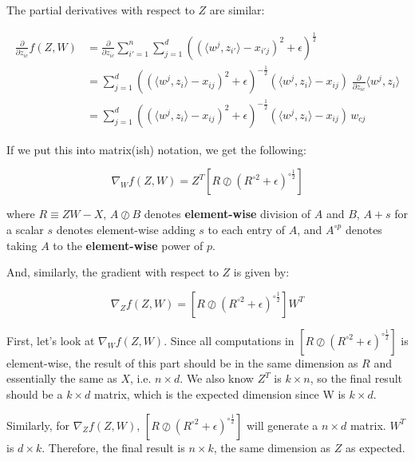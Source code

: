 The partial derivatives with respect to $Z$ are similar:

\begin{align*}
\frac{\partial}{\partial z_{ic}} f(Z,W)
  &= \frac{\partial}{\partial z_{ic}} \sum_{i'=1}^n \sum_{j=1}^d  \left( (\langle w^j, z_{i'}\rangle - x_{i'j})^2 + \epsilon \right)^{\frac12}\\
  &= \sum_{j=1}^d  \left( (\langle w^j, z_{i}\rangle - x_{ij})^2 + \epsilon \right)^{-\frac12}   (\langle w^j, z_{i}\rangle - x_{ij}) \; \frac{\partial}{\partial z_{ic}} \langle w^j, z_i\rangle \\
  &= \sum_{j=1}^d  \left( (\langle w^j, z_i\rangle - x_{ij})^2 + \epsilon \right)^{-\frac12}  (\langle w^j, z_i\rangle - x_{ij}) \, w_{cj}
\end{align*}

If we put this into matrix(ish) notation, we get the following:

\[
\nabla_W f(Z,W) = Z^T \left[ R \oslash \left(R^{\circ 2} + \epsilon\right)^{\circ \frac12}  \right]
\]

where $R\equiv ZW-X$,
$A \oslash B$ denotes \textbf{element-wise} division of $A$ and $B$,
$A + s$ for a scalar $s$ denotes element-wise adding $s$ to each entry of $A$,
and $A^{\circ p}$ denotes taking $A$ to the \textbf{element-wise} power of $p$.

And, similarly, the gradient with respect to $Z$ is given by:

\[
\nabla_Z f(Z,W) = \left[ R \oslash \left(R^{\circ 2} + \epsilon\right)^{\circ \frac12} \right] W^T
\]

\begin{answer}
	First, let's look at $\nabla_W f(Z,W)$. Since all computations in $\left[ R \oslash \left(R^{\circ 2} + \epsilon\right)^{\circ \frac12}  \right]$ is element-wise, the result of this part should be in the same dimension as $R$ and essentially the same as $X$, i.e. $n \times d$. We also know $Z^T$ is $k \times n$, so the final result should be a $k \times d$ matrix, which is the expected dimension since W is $k \times d$.

	Similarly, for $\nabla_Z f(Z,W)$, $\left[ R \oslash \left(R^{\circ 2} + \epsilon\right)^{\circ \frac12} \right]$ will generate a $n \times d$ matrix. $W^T$ is $d \times k$. Therefore, the final result is $n \times k$, the same dimension as $Z$ as expected.
\end{answer}

